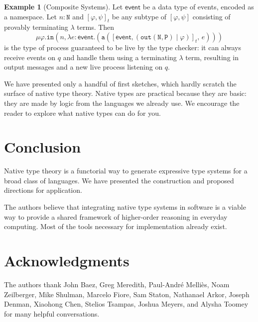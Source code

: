 \documentclass[conference]{IEEEtran}
\theoremstyle{definition}
\newtheorem{example}[theorem]{Example}
\newcommand{\msf}[1]{\mathsf{#1}}
\newcommand{\mtt}[1]{\mathtt{#1}}
\newcommand{\N}{\mtt{N}}
\newcommand{\PP}{\mtt{P}}
\newcommand{\tto}{\mtt{out}}
\begin{document}
\begin{example}[Composite Systems]
Let $\msf{event}$ be a data type of events, encoded as a namespace. Let $n:\N$ and $[\varphi,\psi]_t$ be any subtype of $[\varphi,\psi]$ consisting of provably terminating $\lambda$ terms.  Then 
$$\mu \varphi.\mtt{in}(n, \lambda e:\msf{event}.(\mtt{a}([\msf{event}, (\tto(\N, \PP) \;|\; \varphi)]_t,\, e)))$$
is the type of process guaranteed to be live by the type checker: it can always receive events on $q$ and handle them using a terminating $\lambda$ term, resulting in output messages and a new live process listening on $q$.
\end{example}

We have presented only a handful of first sketches, which hardly scratch the surface of native type theory. Native types are practical because they are basic: they are made by logic from the languages we already use. We encourage the reader to explore what native types can do for you.



\section{Conclusion}
Native type theory is a functorial way to generate expressive type systems for a broad class of languages. We have presented the construction and proposed directions for application.

The authors believe that integrating native type systems in software is a viable way to provide a shared framework of higher-order reasoning in everyday computing. Most of the tools necessary for implementation already exist.



\section*{Acknowledgments}
The authors thank John Baez, Greg Meredith, Paul-Andr{\'{e}} Melli{\`{e}}s, Noam Zeilberger, Mike Shulman, Marcelo Fiore, Sam Staton, Nathanael Arkor, Joseph Denman, Xiaohong Chen, Stelios Tsampas, Joshua Meyers, and Alysha Toomey for many helpful conversations.
%



\end{document}
